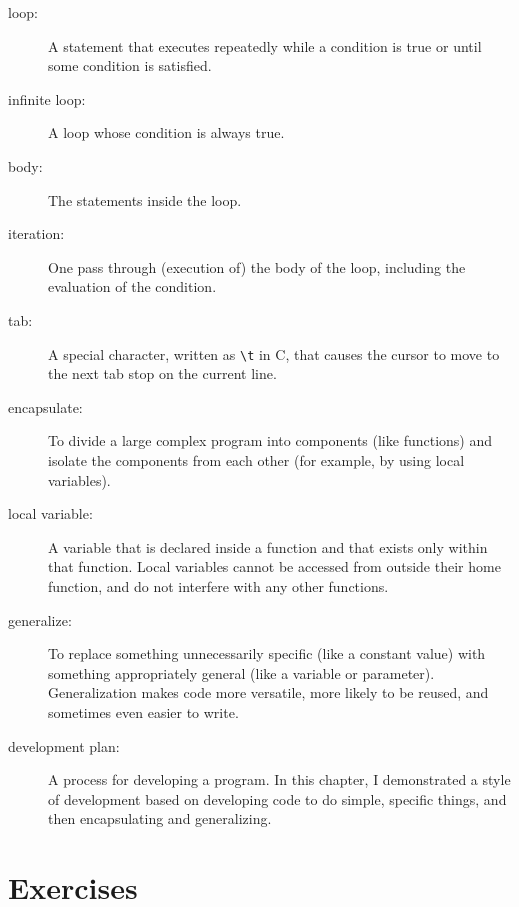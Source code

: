 \begin{description}

\item[loop:]  A statement that executes repeatedly while a
condition is true or until some condition is satisfied.

\item[infinite loop:]  A loop whose condition is always true.

\item[body:]  The statements inside the loop.

\item[iteration:]  One pass through (execution of) the body
of the loop, including the evaluation of the condition.

\item[tab:] A special character, written as \verb+\t+ in C,
that causes the cursor to move to the next tab stop on the
current line.

\item[encapsulate:]  To divide a large complex program into
components (like functions) and isolate the components from
each other (for example, by using local variables).

\item[local variable:]  A variable that is declared inside
a function and that exists only within that function.  Local variables
cannot be accessed from outside their home function, and do not
interfere with any other functions.

\item[generalize:]  To replace something unnecessarily specific
(like a constant value) with something appropriately general
(like a variable or parameter).  Generalization makes code more
versatile, more likely to be reused, and sometimes even easier
to write.

\item[development plan:]  A process for developing a program.
In this chapter, I demonstrated a style of development based on
developing code to do simple, specific things, and then encapsulating
and generalizing.


\end{description}

\section{Exercises}
\setcounter{exercisenum}{0}



